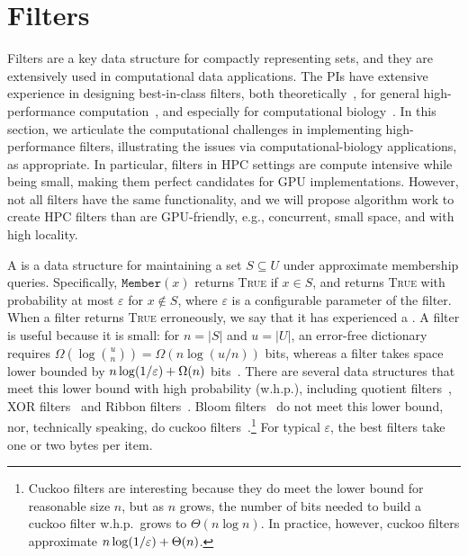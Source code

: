 
\section{Filters}

Filters are a key data structure for compactly representing sets, and they are extensively used in computational data applications.  The PIs have extensive experience in designing best-in-class filters, both theoretically~\cite{BenderFaGo18,BenderDaFa21,BenderFaKu22b,BenderCoFa23b}, for general high-performance computation~\cite{conway2020splinterdb,PandeyBeCo23,PandeyBJP17,BenderFaJo12}, and especially for computational biology~\cite{AlmodaresiPFJP20,PandeyAlBe18,PandeyBeJo18, almodaresi2017rainbowfish,PandeyBeJo17b}.
In this section, we articulate the computational challenges in implementing high-performance filters, illustrating the issues via computational-biology applications, as appropriate. 
In particular, filters in HPC settings are compute intensive while being small, making them perfect candidates for GPU implementations.  
However, not all filters have the same functionality, and we will propose algorithm work to create HPC filters than are GPU-friendly, e.g., concurrent, small space, and with high locality.



A  is a data structure for maintaining a set $S\subseteq U$ under approximate membership queries. Specifically, $\texttt{Member}(x)$ returns \textsc{True} if $x\in S$, and returns \textsc{True} with probability at most $\varepsilon$ for $x\notin S$, where $\varepsilon$ is a configurable parameter of the filter.  When a filter returns \textsc{True} erroneously, we say that it has experienced a .
%
A filter is useful because it is small: for $n= |S|$ and $u = |U|$, an error-free dictionary requires $\Omega\left(\log \binom{u}{n}\right) = \Omega(n \log (u/n))$ bits, whereas a filter  takes space lower bounded by $n\log (1/\varepsilon) + \Omega(n)$ bits~\cite{CarterFG78}.  There are several data structures that meet this lower bound with high probability (w.h.p.), including quotient filters~\cite{Cleary84,PaghPaRa05,DillingerM09,BenderFaJo12,PandeyBJP17,PandeyCDBFJ21}, XOR filters~\cite{GrafLe20} and Ribbon filters~\cite{DillingerW21}.  Bloom filters~\cite{Bloom70} do not meet this lower bound, nor, technically speaking, do cuckoo filters~\cite{FanAnKa14,BreslowJ18}.\footnote{Cuckoo filters are interesting because they do meet the lower bound for reasonable size $n$, but as $n$ grows, the number of bits needed to build a cuckoo filter w.h.p.\ grows to $\Theta(n\log n)$.  In practice, however, cuckoo filters approximate $n\log (1/\varepsilon) + \Theta(n)$.}
%
For typical $\varepsilon$, the best filters take one or two bytes per item.

